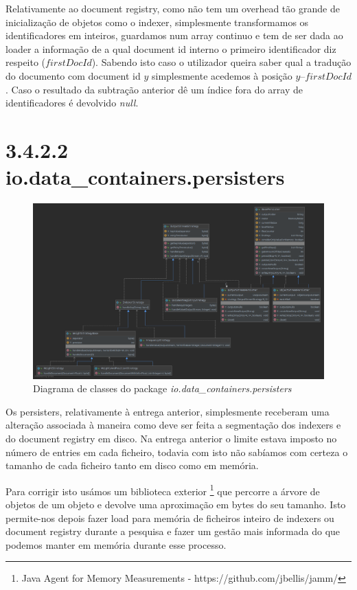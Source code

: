 \documentclass[12pt]{article}
\begin{document}
Relativamente ao document registry, como não tem um overhead tão
grande de inicialização de objetos como o indexer, simplesmente
transformamos os identificadores em inteiros, guardamos num array
continuo e tem de ser dada ao loader a informação de a qual document
id interno o primeiro identificador diz respeito ($firstDocId$).
Sabendo isto caso o utilizador queira saber qual a tradução do
documento com document id $y$ simplesmente acedemos à posição $y –
firstDocId$. Caso o resultado da subtração anterior dê um índice fora
do array de identificadores é devolvido {\it null}.


\section*{3.4.2.2 io.data\_containers.persisters}
\begin{figure}[H]
  \center
   \includegraphics[width=\linewidth]{packages_io_data_containers_persisters.png}
  \caption{Diagrama de classes do package \it
    io.data\_containers.persisters}
\end{figure}

Os persisters, relativamente à entrega anterior, simplesmente
receberam uma alteração associada à maneira como deve ser feita a
segmentação dos indexers e do document registry em disco.
Na entrega anterior o limite estava imposto no número de entries em
cada ficheiro, todavia com isto não sabíamos com certeza o tamanho de
cada ficheiro tanto em disco como em memória.

Para corrigir isto usámos um biblioteca exterior \footnote{Java Agent
for Memory Measurements - https://github.com/jbellis/jamm/} que
percorre a árvore de objetos de um objeto e devolve uma aproximação
em bytes do seu tamanho.
Isto permite-nos depois fazer load para memória de ficheiros inteiro
de indexers ou document registry durante a pesquisa e fazer um gestão
mais informada do que podemos manter em memória durante esse
processo.
\end{document}

